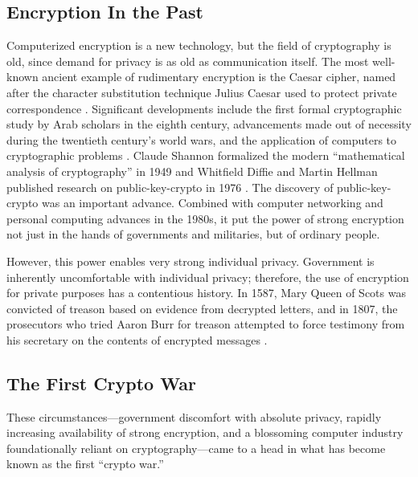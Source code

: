 \subsection{Encryption In the Past}
\label{sec-history-old}

Computerized encryption is a new technology, but the field of cryptography is old, since demand for privacy is as old as
communication itself. The most well-known ancient example of rudimentary encryption is the Caesar cipher, named after
the character substitution technique Julius Caesar used to protect private correspondence
\cite{luciano_cryptology_1987}. Significant developments include the first formal cryptographic study by Arab scholars
in the eighth century, advancements made out of necessity during the twentieth century's world wars, and the application
of computers to cryptographic problems \cite{kahn_codebreakers_1996}. Claude Shannon formalized the modern
``mathematical analysis of cryptography'' in 1949 \cite{shannon_communication_1949} and Whitfield Diffie and Martin
Hellman published research on \ac{public-key-crypto} in 1976 \cite{diffie_new_1976}. The discovery of
\ac{public-key-crypto} was an important advance. Combined with computer networking and personal computing advances in
the 1980s, it put the power of strong encryption not just in the hands of governments and militaries, but of ordinary
people.

However, this power enables very strong individual privacy. Government is inherently uncomfortable with individual
privacy; therefore, the use of encryption for private purposes has a contentious history. In 1587, Mary Queen of Scots
was convicted of treason based on evidence from decrypted letters, and in 1807, the prosecutors who tried Aaron Burr for
treason attempted to force testimony from his secretary on the contents of encrypted messages
\cite{kerr_encryption_2017}.

\subsection{The First Crypto War}
\label{sec-history-cw1}

These circumstances---government discomfort with absolute privacy, rapidly increasing availability of strong encryption,
and a blossoming computer industry foundationally reliant on cryptography---came to a head in what has become known as
the first ``crypto war.''

